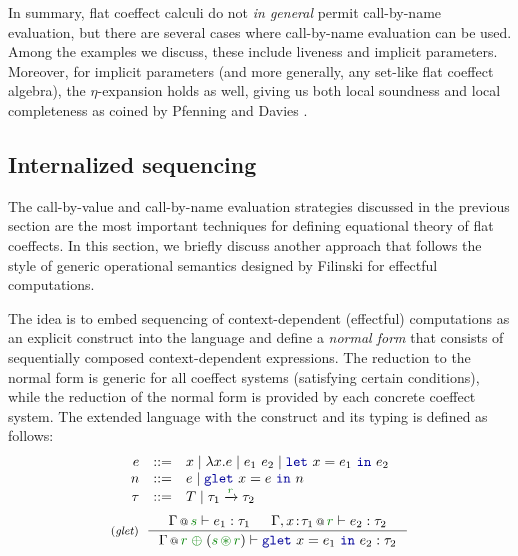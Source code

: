 \noindent
In summary, flat coeffect calculi do not \emph{in general} permit call-by-name evaluation, but
there are several cases where call-by-name evaluation can be used. Among the examples we discuss,
these include liveness and implicit parameters. Moreover, for implicit parameters (and more
generally, any set-like flat coeffect algebra), the $\eta$-expansion holds as well, giving us
both local soundness and local completeness as coined by Pfenning and Davies \cite{logic-modal-reconstruction}.


\subsection{Internalized sequencing}
\label{sec:flat-syntax-norm}

The call-by-value and call-by-name evaluation strategies discussed in the previous section are
the most important techniques for defining equational theory of flat coeffects. In this section, 
we briefly discuss another approach that follows the style of generic operational semantics 
designed by Filinski \cite{monads-inaction} for effectful computations.

The idea is to embed sequencing of context-dependent (effectful) computations as an explicit 
construct into the language and define a \emph{normal form} that consists of sequentially composed 
context-dependent expressions. The reduction to the normal form is generic for all coeffect systems 
(satisfying certain conditions), while the reduction of the normal form is provided by each 
concrete coeffect system. The extended language with the  construct and its typing is 
defined as follows:
%
\begin{equation*}
\begin{array}{rcl}
e &::=& x \sep \lambda x.e \sep e_1~e_2 \sep \kvd{let}~x = e_1~\kvd{in}~e_2 \\
n &::=& e \sep \kvd{glet}~x=e~\kvd{in}~n\\
\tau &::=& T \sep \tau_1 \xrightarrow{\cclrd{r}} \tau_2
\end{array}
\end{equation*}
\begin{equation*}
\tyrule{glet}
  { \coctx{\Gamma}{\cclrd{s}} \vdash e_1 : \tau_1 &
    \coctx{\Gamma, x\!:\!\tau_1}{\cclrd{r}} \vdash e_2 : \tau_2 }
  { \coctx{\Gamma}{\cclrd{r}\;\cpar\;({\cclrd{s}\,\cseq\,\cclrd{r})}} \vdash \kvd{glet}~x=e_1~\kvd{in}~e_2 : \tau_2 }
\end{equation*}

